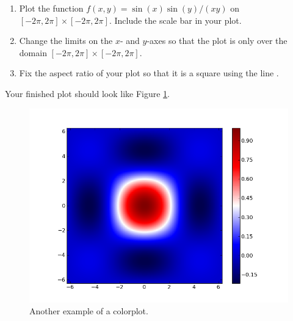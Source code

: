 \begin{problem}
\leavevmode
\begin{enumerate}
\item Plot the function $f(x,y) = \sin(x)\sin(y)/(xy)$ on $[-2\pi,2\pi] \times [-2\pi,2\pi]$. 
Include the scale bar in your plot.
\item Change the limits on the $x$- and $y$-axes so that the plot is only over the domain $[-2\pi,2\pi] \times [-2\pi,2\pi]$.
\item Fix the aspect ratio of your plot so that it is a square using the line .
\end{enumerate}
Your finished plot should look like Figure \ref{fig:heatmapProb}.

\begin{figure}[H]
\includegraphics[width=\textwidth]{pcolor2.png}
\caption{Another example of a colorplot.}
\label{fig:heatmapProb}
\end{figure}
\end{problem}

